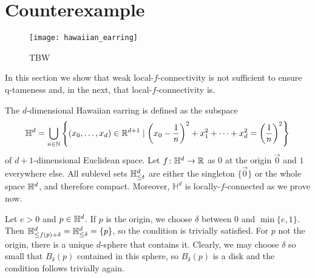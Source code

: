 
\section{Counterexample} \label{sec:counterexample}

\begin{figure}[t]
	\centering
	\texttt{[image: hawaiian\_earring]}
	\hfill
	\caption{TBW}
	\label{fig:earrings}
\end{figure}

In this section we show that weak local-$f$-connectivity is not sufficient to ensure q-tameness and, in the next, that local-$f$-connectivity is. 

The $d$-dimensional Hawaiian earring is defined as the subspace
\begin{equation*}
\mathbb{H}^d = \bigcup_{n\in\mathbb{N}}\left\{(x_0,\dots,x_d)\in\mathbb{R}^{d+1}\mid \left(x_0-\frac{1}{n}\right)^2+x_1^2+\dots+x_d^2=\left(\frac{1}{n}\right)^2\right\}
\end{equation*}
of $d+1$-dimensional Euclidean space.
Let $f \colon \mathbb{H}^{d}\to\mathbb{R}$ as $0$ at the origin $\vec{0}$ and $1$ everywhere else.
All sublevel sets $\mathbb{H}^d_{\leq t}$ are either the singleton $\{\vec{0}\}$ or the whole space $\mathbb{H}^d$, and therefore compact.
Moreover, $\mathbb{H}^{d}$ is locally-$f$-connected as we prove now. 

Let $e > 0$ and $p \in \mathbb{H}^d$.
If $p$ is the origin, we choose $\delta$ between 0 and $\min\{e,1\}$.
Then $\mathbb{H}^d_{\leq f(p) + \delta} = \mathbb{H}^d_{\leq \delta} = \{p\}$, so the condition is trivially satisfied.
For $p$ not the origin, there is a unique $d$-sphere that contains it.
Clearly, we may choose $\delta$ so small that $B_{\delta}(p)$ contained in this sphere, so $B_{\delta}(p)$ is a disk and the condition follows trivially again. 

